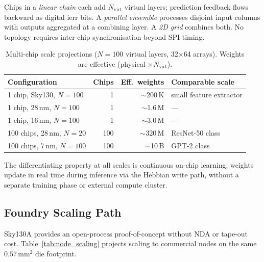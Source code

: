 \documentclass[journal,10pt,twoside]{IEEEtran}
\begin{document}
Chips in a \emph{linear chain} each add $N_\text{virt}$ virtual layers;
prediction feedback flows backward as digital ierr bits.
A \emph{parallel ensemble} processes disjoint input columns with outputs
aggregated at a combining layer.
A \emph{2D grid} combines both.
No topology requires inter-chip synchronisation beyond SPI timing.

\begin{table}[t]
\caption{Multi-chip scale projections ($N=100$ virtual layers,
32$\times$64 arrays). Weights are effective (physical $\times N_\text{virt}$).}
\label{tab:multichip}
\centering
\footnotesize
\begin{tabular}{P{2.5cm}rrP{1.8cm}}
\toprule
Configuration & Chips & Eff.\ weights & Comparable scale \\
 chip, Sky130, $N=100$ & 1 & $\sim$200\,K & small feature extractor \\
1 chip, 28\,nm, $N=100$ & 1 & $\sim$1.6\,M & — \\
1 chip, 16\,nm, $N=100$ & 1 & $\sim$3.0\,M & — \\
100 chips, 28\,nm, $N=20$ & 100 & $\sim$320\,M & ResNet-50 class \\
100 chips, 7\,nm, $N=100$ & 100 & $\sim$10\,B & GPT-2 class \\
\bottomrule
\end{tabular}
\end{table}

The differentiating property at all scales is continuous on-chip learning:
weights update in real time during inference via the Hebbian write path,
without a separate training phase or external compute cluster.

\subsection{Foundry Scaling Path}
\label{sec:foundry}

Sky130A provides an open-process proof-of-concept without NDA or
tape-out cost.
Table~\ref{tab:node_scaling} projects scaling to commercial nodes on the
same $0.57$\,mm$^2$ die footprint.

\begin{table}[t]
\caption{Node scaling on the current $0.57$\,mm$^2$ die footprint
($N_\text{virt}=100$, 50\% analogue area fraction).
Cell areas are estimates; TOPS/W includes the full VL cycle.}
\label{tab:node_scaling}
\centering
\footnotesize
{}
\end{table}
\end{document}

